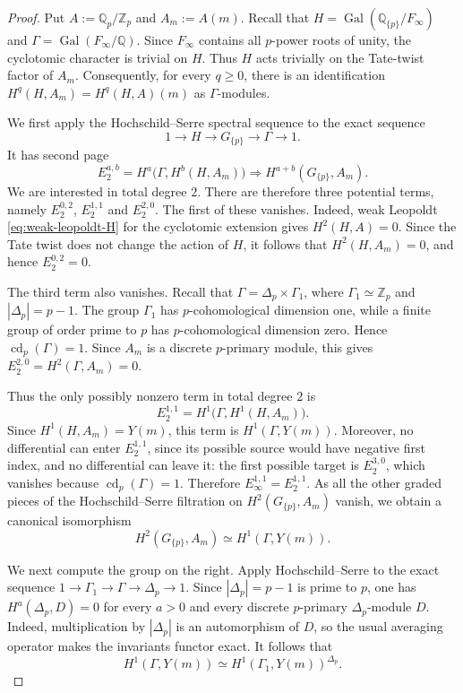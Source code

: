 \documentclass[10pt,a4paper]{amsart}
\newcommand{\Gal}{\operatorname{Gal}}
\newcommand{\Q}{\mathbb Q}
\newcommand{\Qp}{\mathbb Q_p}
\newcommand{\Zp}{\mathbb Z_p}
\begin{document}
\begin{proof}
Put $A:=\Qp/\Zp$ and $A_m:=A(m)$. Recall that
$H=\Gal(\Q_{\{p\}}/F_\infty)$ and
$\Gamma=\Gal(F_\infty/\Q)$. Since $F_\infty$ contains all
$p$-power roots of unity, the cyclotomic character is trivial on
$H$. Thus $H$ acts trivially on the Tate-twist factor of $A_m$.
Consequently, for every $q\geq0$, there is an identification
$H^q(H,A_m)=H^q(H,A)(m)$ as $\Gamma$-modules. 

We first apply the Hochschild--Serre spectral sequence to the exact
sequence
\[
 1\longrightarrow H\longrightarrow G_{\{p\}}
 \longrightarrow\Gamma\longrightarrow1.
\]
It has second page
\[
 E_2^{a,b}
 =
 H^a\bigl(\Gamma,H^b(H,A_m)\bigr)
 \Longrightarrow
 H^{a+b}(G_{\{p\}},A_m).
\]
We are interested in total degree $2$. There are therefore three
potential terms, namely $E_2^{0,2}$, $E_2^{1,1}$ and $E_2^{2,0}$. The first of these vanishes. Indeed, weak Leopoldt \eqref{eq:weak-leopoldt-H} for the
cyclotomic extension gives $H^2(H,A)=0$. Since the Tate twist does
not change the action of $H$, it follows that $H^2(H,A_m)=0$, and
hence $E_2^{0,2}=0$.

The third term also vanishes. Recall that
$\Gamma=\Delta_p\times\Gamma_1$, where $\Gamma_1\simeq\Zp$ and
$|\Delta_p|=p-1$. The group $\Gamma_1$ has $p$-cohomological
dimension one, while a finite group of order prime to $p$ has
$p$-cohomological dimension zero. Hence
$\operatorname{cd}_p(\Gamma)=1$. Since $A_m$ is a discrete
$p$-primary module, this gives
$E_2^{2,0}=H^2(\Gamma,A_m)=0$.

Thus the only possibly nonzero term in total degree $2$ is
\[
 E_2^{1,1}
 =
 H^1\bigl(\Gamma,H^1(H,A_m)\bigr).
\]
Since $H^1(H,A_m)=Y(m)$, this term is
$H^1(\Gamma,Y(m))$. Moreover, no differential can enter
$E_2^{1,1}$, since its possible source would have negative first
index, and no differential can leave it: the first possible target
is $E_2^{3,0}$, which vanishes because
$\operatorname{cd}_p(\Gamma)=1$. Therefore
$E_\infty^{1,1}=E_2^{1,1}$. As all the other graded pieces of the
Hochschild--Serre filtration on $H^2(G_{\{p\}},A_m)$ vanish, we
obtain a canonical isomorphism
\begin{equation}\label{eq:HS-H2}
 H^2(G_{\{p\}},A_m)
 \simeq H^1(\Gamma,Y(m)).
\end{equation}

We next compute the group on the right. Apply Hochschild--Serre to
the exact sequence $1\to\Gamma_1\to\Gamma\to\Delta_p\to1$. Since
$|\Delta_p|=p-1$ is prime to $p$, one has
$H^a(\Delta_p,D)=0$ for every $a>0$ and every discrete
$p$-primary $\Delta_p$-module $D$. Indeed, multiplication by
$|\Delta_p|$ is an automorphism of $D$, so the usual averaging
operator makes the invariants functor exact. It follows that
\[
 H^1(\Gamma,Y(m))
 \simeq H^1(\Gamma_1,Y(m))^{\Delta_p}.
\]


\end{proof}
\end{document}
